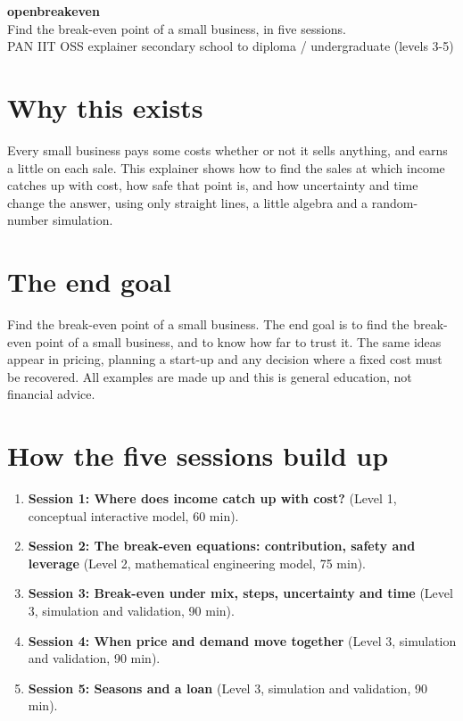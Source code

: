 \documentclass[11pt,a4paper]{article}
\begin{document}
\begin{center}{\LARGE\bfseries openbreakeven}\\[0.4em]{\large Find the break-even point of a small business, in five sessions.}\\[0.2em]\small PAN IIT OSS explainer \textbullet{} secondary school to diploma / undergraduate (levels 3-5)\end{center}

\section*{Why this exists}
Every small business pays some costs whether or not it sells anything, and earns a little on each sale. This explainer shows how to find the sales at which income catches up with cost, how safe that point is, and how uncertainty and time change the answer, using only straight lines, a little algebra and a random-number simulation.

\section*{The end goal}
Find the break-even point of a small business. The end goal is to find the break-even point of a small business, and to know how far to trust it. The same ideas appear in pricing, planning a start-up and any decision where a fixed cost must be recovered. All examples are made up and this is general education, not financial advice.

\section*{How the five sessions build up}
\begin{enumerate}[nosep]
\item \textbf{Session 1: Where does income catch up with cost?} (Level 1, conceptual interactive model, 60 min).
\item \textbf{Session 2: The break-even equations: contribution, safety and leverage} (Level 2, mathematical engineering model, 75 min).
\item \textbf{Session 3: Break-even under mix, steps, uncertainty and time} (Level 3, simulation and validation, 90 min).
\item \textbf{Session 4: When price and demand move together} (Level 3, simulation and validation, 90 min).
\item \textbf{Session 5: Seasons and a loan} (Level 3, simulation and validation, 90 min).
\end{enumerate}
\end{document}
